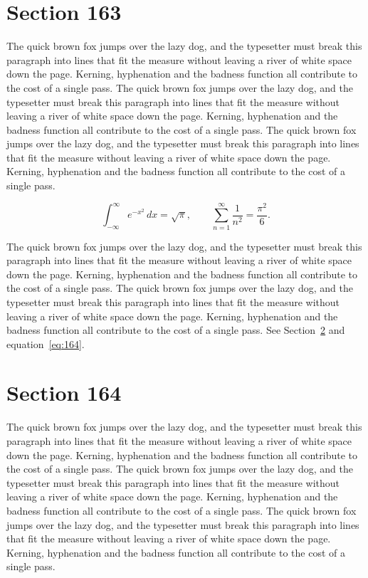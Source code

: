 \documentclass{article}
\begin{document}
\section{Section 163}
\label{sec:163}
The quick brown fox jumps over the lazy dog, and the typesetter must break this paragraph into lines that fit the measure without leaving a river of white space down the page. Kerning, hyphenation and the badness function all contribute to the cost of a single pass. The quick brown fox jumps over the lazy dog, and the typesetter must break this paragraph into lines that fit the measure without leaving a river of white space down the page. Kerning, hyphenation and the badness function all contribute to the cost of a single pass. The quick brown fox jumps over the lazy dog, and the typesetter must break this paragraph into lines that fit the measure without leaving a river of white space down the page. Kerning, hyphenation and the badness function all contribute to the cost of a single pass. 

\begin{equation}\label{eq:163}
\int_{-\infty}^{\infty} e^{-x^{2}}\,dx = \sqrt{\pi}, \qquad
\sum_{n=1}^{\infty} \frac{1}{n^{2}} = \frac{\pi^{2}}{6}.
\end{equation}

The quick brown fox jumps over the lazy dog, and the typesetter must break this paragraph into lines that fit the measure without leaving a river of white space down the page. Kerning, hyphenation and the badness function all contribute to the cost of a single pass. The quick brown fox jumps over the lazy dog, and the typesetter must break this paragraph into lines that fit the measure without leaving a river of white space down the page. Kerning, hyphenation and the badness function all contribute to the cost of a single pass. 
See Section~\ref{sec:164} and equation~\eqref{eq:164}.
\section{Section 164}
\label{sec:164}
The quick brown fox jumps over the lazy dog, and the typesetter must break this paragraph into lines that fit the measure without leaving a river of white space down the page. Kerning, hyphenation and the badness function all contribute to the cost of a single pass. The quick brown fox jumps over the lazy dog, and the typesetter must break this paragraph into lines that fit the measure without leaving a river of white space down the page. Kerning, hyphenation and the badness function all contribute to the cost of a single pass. The quick brown fox jumps over the lazy dog, and the typesetter must break this paragraph into lines that fit the measure without leaving a river of white space down the page. Kerning, hyphenation and the badness function all contribute to the cost of a single pass. 
\end{document}
